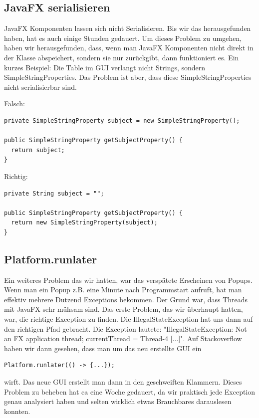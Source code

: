 \documentclass[11pt,titelpage]{scrartcl}
\begin{document}
\subsection{JavaFX serialisieren}
JavaFX Komponenten lassen sich nicht Serialisieren. Bis wir das herausgefunden haben, hat es auch einige Stunden gedauert. Um dieses Problem zu umgehen, haben wir herausgefunden, dass,
wenn man JavaFX Komponenten nicht direkt in der Klasse abspeichert, sondern sie nur zurückgibt, dann funktioniert es. Ein kurzes Beispiel:
Die Table im GUI verlangt nicht Strings, sondern SimpleStringProperties. Das Problem ist aber, dass diese SimpleStringProperties nicht serialisierbar sind.

Falsch:
\begin{lstlisting}
private SimpleStringProperty subject = new SimpleStringProperty();

public SimpleStringProperty getSubjectProperty() {
  return subject;
}
\end{lstlisting}

Richtig:
\begin{lstlisting}
private String subject = "";

public SimpleStringProperty getSubjectProperty() {
  return new SimpleStringProperty(subject);
}
\end{lstlisting}

\subsection{Platform.runlater}
Ein weiteres Problem das wir hatten, war das verspätete Erscheinen von Popups. Wenn man ein Popup z.B. eine Minute nach Programmstart aufruft, hat man effektiv mehrere Dutzend Exceptions bekommen.
Der Grund war, dass Threads mit JavaFX sehr mühsam sind. Das erste Problem, das wir überhaupt hatten, war, die richtige Exception zu finden. Die IllegalStateException hat uns dann auf den richtigen Pfad gebracht.
Die Exception lautete: "IllegalStateException: Not an FX application thread; currentThread = Thread-4 [...]". Auf Stackoverflow haben wir dann gesehen, dass man um das neu erstellte GUI ein
\begin{lstlisting}
Platform.runlater(() -> {...});
\end{lstlisting}
wirft. Das neue GUI erstellt man dann in den geschweiften Klammern.
Dieses Problem zu beheben hat ca eine Woche gedauert, da wir praktisch jede Exception genau analysiert haben und selten wirklich etwas Brauchbares darauslesen konnten.
\end{document}
